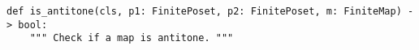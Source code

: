 \begin{verbatim}
def is_antitone(cls, p1: FinitePoset, p2: FinitePoset, m: FiniteMap) -> bool:
    """ Check if a map is antitone. """
\end{verbatim}